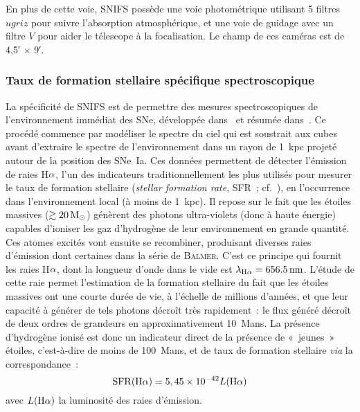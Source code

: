\documentclass[../main/main.tex]{subfiles}
\begin{document}
En plus de cette voie, SNIFS possède une voie photométrique utilisant 5 filtres
$ugriz$ pour suivre l'absorption atmosphérique, et une voie de guidage avec un
filtre $V$ pour aider le télescope à la focalisation. Le champ de ces caméras
est de \ang{;4,5;} $\times$ \ang{;9;}.

\subsubsection{Taux de formation stellaire spécifique
spectroscopique}\label{sssec:snflssfr}

La spécificité de SNIFS est de permettre des mesures spectroscopiques de
l'environnement immédiat des SNe, développée dans~\cite{rigault2013} et résumée
dans~\cite{rigault2020}. Ce procédé commence par modéliser le spectre du ciel
qui est soustrait aux cubes avant d'extraire le spectre de l'environnement dans
un rayon de \SI{1}{kpc} projeté autour de la position des SNe~Ia. Ces données
permettent de détecter l'émission de raies H$\alpha$, l'un des indicateurs
traditionnellement les plus utilisés pour mesurer le taux de formation stellaire
(\textit{stellar formation rate}, SFR~; cf.~\cite{kennicutt1998}), en
l'occurrence dans l'environnement local (à moins de \SI{1}{kpc}). Il repose sur
le fait que les étoiles massives ($\gtrsim \SI{20}{\ensuremath{M_{\odot}}}$) génèrent des photons
ultra-violets (donc à haute énergie) capables d'ioniser les gaz d'hydrogène de
leur environnement \citep{calzetti2012} en grande quantité. Ces atomes excités
vont ensuite se recombiner, produisant diverses raies d'émission dont certaines
dans la série de \textsc{Balmer}. C'est ce principe qui fournit les raies H$\alpha$,
dont la longueur d'onde dans le vide est $\lambda_{\mathrm{H}\alpha} =
\SI{656.5}{nm}$. L'étude de cette raie permet l'estimation de la formation
stellaire du fait que les étoiles massives ont une courte durée de vie, à
l'échelle de millions d'années, et que leur capacité à générer de tels photons
décroît très rapidement~: le flux généré décroît de deux ordres de grandeurs
en approximativement \SI{10}{Mans}. La présence d'hydrogène ionisé est donc un
indicateur direct de la présence de «~jeunes~» étoiles, c'est-à-dire de moins de
\SI{100}{Mans}, et de taux de formation stellaire \textit{via} la
correspondance~:
\begin{equation}
    \mathrm{SFR}(\mathrm{H}\alpha) = 5,45\times 10^{-42}L(\mathrm{H}\alpha)
\end{equation}
avec $L(\mathrm{H}\alpha)$ la luminosité des raies d'émission.
\end{document}
